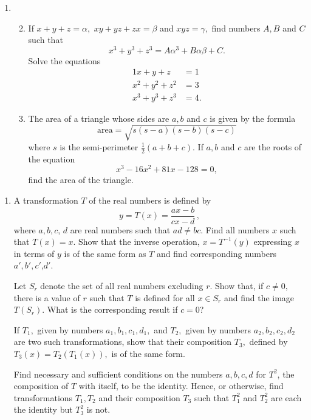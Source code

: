 \documentclass[a4, 11pt]{report}
\newlength{\qspace}
\newcounter{qnumber}
\newenvironment{question}%
 {\vspace{\qspace}
  \begin{enumerate}[\bfseries 1\quad][10]%
    \setcounter{enumi}{\value{qnumber}}%
    \item%
 }
{
  \end{enumerate}
  \filbreak
  \stepcounter{qnumber}
 }
\newenvironment{questionparts}[1][1]%
 {
  \begin{enumerate}[\bfseries (i)]%
    \setcounter{enumii}{#1}
    \addtocounter{enumii}{-1}
    \setlength{\itemsep}{5mm}
    \setlength{\parskip}{8pt}
 }
 {
  \end{enumerate}
 }
\begin{document}
\begin{question}
\begin{questionparts}
	 \item If $x+y+z=\alpha,$ $xy+yz+zx=\beta$ and
$xyz=\gamma,$ find numbers $A,B$ and $C$ such that 
\[
x^{3}+y^{3}+z^{3}=A\alpha^{3}+B\alpha\beta+C.
\]
Solve the equations 
\begin{alignat*}{1}
x+y+z & =1\\
x^{2}+y^{2}+z^{2} & =3\\
x^{3}+y^{3}+z^{3} & =4.
\end{alignat*}



\item The area of a triangle whose sides are $a,b$ and $c$ is given
by the formula 
\[
\mathrm{area}=\sqrt{s(s-a)(s-b)(s-c)}
\]
where $s$ is the semi-perimeter $\frac{1}{2}(a+b+c).$ If $a,b$
and $c$ are the roots of the equation 
\[
x^{3}-16x^{2}+81x-128=0,
\]
find the area of the triangle. 
\end{questionparts}
\end{question}
		
\begin{question}	
A transformation $T$ of the real numbers is defined by 
\[
y=T(x)=\frac{ax-b}{cx-d}\,,
\]
where $a,b,c$, $d$ are real numbers such that $ad\neq bc$. Find
all numbers $x$ such that $T(x)=x.$ Show that the inverse operation,
$x=T^{-1}(y)$ expressing $x$ in terms of $y$ is of the same form
as $T$ and find corresponding numbers $a',b',c'$,$d'$. 


Let $S_{r}$ denote the set of all real numbers excluding $r$. Show
that, if $c\neq0,$ there is a value of $r$ such that $T$ is defined
for all $x\in S_{r}$ and find the image $T(S_{r}).$ What is the
corresponding result if $c=0$? 


If $T_{1},$ given by numbers $a_{1},b_{1},c_{1},d_{1},$ and $T_{2},$
given by numbers $a_{2},b_{2},c_{2},d_{2}$ are two such transformations,
show that their composition $T_{3},$ defined by $T_{3}(x)=T_{2}(T_{1}(x)),$
is of the same form. 


Find necessary and sufficient conditions on the numbers $a,b,c,d$
for $T^{2}$, the composition of $T$ with itself, to be the identity.
Hence, or otherwise, find transformations $T_{1},T_{2}$ and their
composition $T_{3}$ such that $T_{1}^{2}$ and $T_{2}^{2}$ are each
the identity but $T_{3}^{2}$ is not. 
\end{question}	
		
\end{document}
